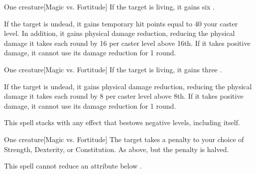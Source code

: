\spellrng{\rngclose}
\spelldur{\durshort}
\begin{spelltarget}{One creature}[Magic vs. Fortitude]
    \spelleffect If the target is living, it gains six \negativelevels.

    \spelleffect If the target is undead, it gains temporary hit points equal to 40 \add your caster level. In addition, it gains physical damage reduction, reducing the physical damage it takes each round by 16  per caster level above 16th. If it takes positive damage, it cannot use its damage reduction for 1 round.
\end{spelltarget}

\spellrng{\rngclose}
\spelldur{\durshort}
\begin{spelltarget}{One creature}[Magic vs. Fortitude]
    \spelleffect If the target is living, it gains three \negativelevels.

    If the target is undead, it gains physical damage reduction, reducing the physical damage it takes each round by 8  per caster level above 8th. If it takes positive damage, it cannot use its damage reduction for 1 round.
\end{spelltarget}
\spellnotes This spell stacks with any effect that bestows negative levels, including itself.

\spellrng{\rngmed}
\spelldur{\durshort}
\begin{spelltarget}{One creature}[Magic vs. Fortitude]
    \spellsuccess The target takes a  penalty to your choice of Strength, Dexterity, or Constitution.
    \spellfailure As above, but the penalty is halved.
\end{spelltarget}
\spellnotes This spell cannot reduce an attribute below .

